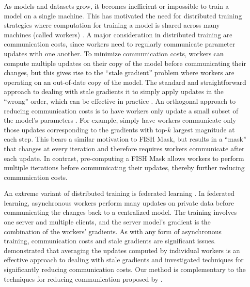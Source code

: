 As models and datasets grow, it becomes inefficient or impossible to train a model on a single machine. This has motivated the need for distributed training strategies where computation for training a model is shared across many machines (called workers) \citep{Dean2012LargeSD}. A major consideration in distributed training are communication costs, since workers need to regularly communicate parameter updates with one another. To minimize communication costs, workers can compute multiple updates on their copy of the model before communicating their changes, but this gives rise to the ``stale gradient'' problem where workers are operating on an out-of-date copy of the model. The standard and straightforward approach to dealing with stale gradients it to simply apply updates in the ``wrong'' order, which can be effective in practice \citep{Dean2012LargeSD,NIPS2011_218a0aef}. An orthogonal approach to reducing communication costs is to have workers only update a small subset of the model's parameters \citep{aji2017sparse,dryden2016communication,strom2015scalable,tao2018esgd}. For example, \citet{aji2017sparse} simply have workers communicate only those updates corresponding to the gradients with top-$k$ largest magnitude at each step. This bears a similar motivation to FISH Mask, but results in a ``mask'' that changes at every iteration and therefore requires workers communicate after each update. In contrast, pre-computing a FISH Mask allows workers to perform multiple iterations before communicating their updates, thereby further reducing communication costs.

An extreme variant of distributed training is federated learning \citep{konevcny2016afederated,mcmahan2017communicationefficient}. In federated learning, asynchronous workers perform many updates on private data before communicating the changes back to a centralized model. The training involves one server and multiple clients, and the server model's gradient is the combination of the workers' gradients. As with any form of asynchronous training, communication costs and stale gradients are significant issues.
\citet{mcmahan2017communicationefficient} demonstrated that averaging the updates computed by individual workers is an effective approach to dealing with stale gradients and \citet{konevcny2016bfederated} investigated techniques for significantly reducing communication costs. Our method is complementary to the techniques for reducing communication proposed by \citet{konevcny2016bfederated}.

